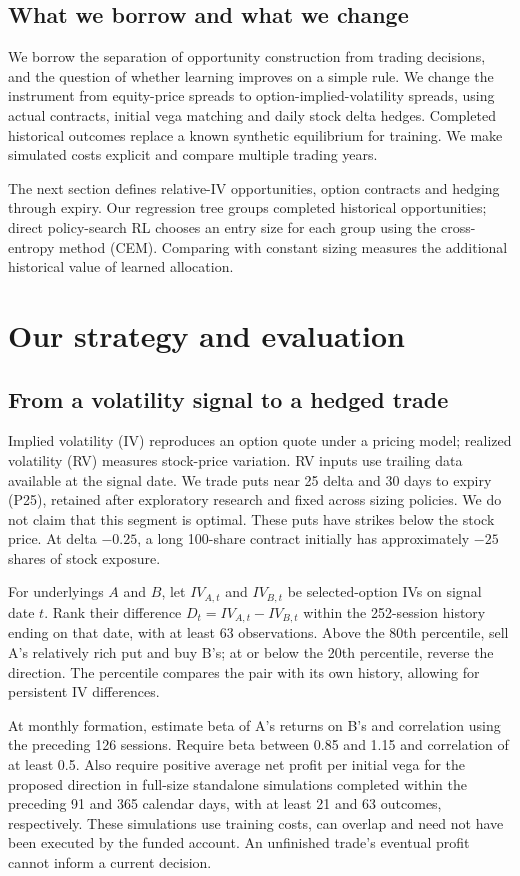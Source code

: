 \documentclass[11pt,letterpaper]{article}
\begin{document}
\subsection*{What we borrow and what we change}
We borrow the separation of opportunity construction from trading decisions,
and the question of whether learning improves on a simple rule. We change the
instrument from equity-price spreads to option-implied-volatility spreads,
using actual contracts, initial vega matching and daily stock delta hedges.
Completed historical outcomes replace a known synthetic equilibrium for
training. We make simulated costs explicit and compare multiple trading years.

The next section defines relative-IV opportunities, option contracts and
hedging through expiry. Our regression tree groups completed historical
opportunities; direct policy-search RL chooses an entry size for each group
using the cross-entropy method (CEM). Comparing with constant sizing measures
the additional historical value of learned allocation.

\clearpage
\section{Our strategy and evaluation}
\subsection{From a volatility signal to a hedged trade}
Implied volatility (IV) reproduces an option quote under a pricing model;
realized volatility (RV) measures stock-price variation. RV inputs use trailing
data available at the signal date. We trade puts near 25 delta and 30 days to
expiry (P25), retained after exploratory research and fixed across sizing
policies. We do not claim that this segment is optimal.
These puts have strikes below the stock price. At delta $-0.25$, a long
100-share contract initially has approximately $-25$ shares of stock exposure.

For underlyings $A$ and $B$, let $IV_{A,t}$ and $IV_{B,t}$ be selected-option
IVs on signal date $t$. Rank their difference $D_t=IV_{A,t}-IV_{B,t}$ within
the 252-session history ending on that date, with at least 63 observations.
Above the 80th percentile, sell A's relatively rich put and buy B's; at or
below the 20th percentile, reverse the direction. The percentile compares
the pair with its own history, allowing for persistent IV differences.

At monthly formation, estimate beta of A's returns on B's and correlation
using the preceding 126 sessions. Require beta between 0.85 and 1.15 and
correlation of at least 0.5. Also require positive average net profit per
initial vega for the proposed direction in full-size standalone simulations
completed within the preceding 91 and 365 calendar days, with at least 21 and
63 outcomes, respectively. These simulations use training costs, can overlap
and need not have been executed by the funded account. An unfinished trade's
eventual profit cannot inform a current decision.
\end{document}
